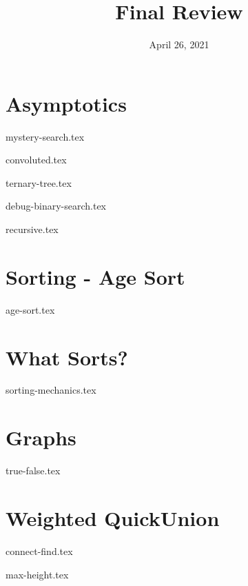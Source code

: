 \documentclass[11pt]{exam}
\title{Final Review}
\date{April 26, 2021}
\begin{document}
\maketitle

\section{Asymptotics}
\begin{questions}
{mystery-search.tex}

{convoluted.tex}

{ternary-tree.tex}

{debug-binary-search.tex}

{recursive.tex}
\end{questions}

\newpage
\section{Sorting - Age Sort}
\begin{questions}
{age-sort.tex}
\end{questions}

\newpage
\section{What Sorts?}
\begin{questions}
{sorting-mechanics.tex}
\end{questions}

\newpage
\section{Graphs}
\begin{questions}
{true-false.tex}
\end{questions}

\newpage
\section{Weighted QuickUnion}
\begin{questions}
{connect-find.tex}

{max-height.tex}
\end{questions}
\end{document}
